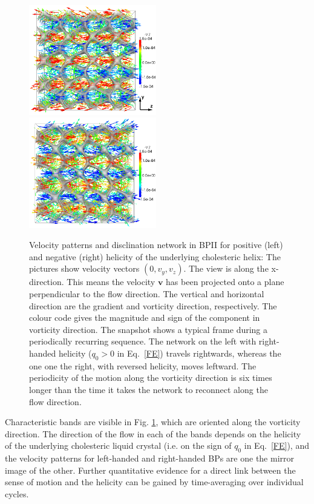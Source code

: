 \documentclass[8.5pt,twoside,twocolumn]{article}
\begin{document}
\begin{figure}[htpb]
\includegraphics[width=0.495\textwidth]{v_yz-v_z-160k_run902.png}
\includegraphics[width=0.495\textwidth]{v_yz-v_z-160k_run903.png}
\caption{Velocity patterns and disclination network in BPII for positive (left) and negative (right) helicity of the 
underlying cholesteric helix: The pictures show velocity vectors $(0,v_y,v_z)$.
The view is along the x-direction. This means the velocity ${\mathbf v}$ 
has been projected onto a plane perpendicular to the flow direction. 
The vertical and horizontal direction are the gradient and vorticity direction, respectively.
The colour code gives the magnitude and sign of the component in vorticity direction.
The snapshot shows a typical frame during a periodically recurring sequence.
The network on the left with right-handed helicity ($q_0>0$ in Eq.~\ref{FE}) travels rightwards, whereas the one one the right,
with reversed helicity, moves leftward. 
The periodicity of the motion along the vorticity direction is six times longer than the time 
it takes the network to reconnect along the flow direction.}
\label{bp2-velo}
\end{figure}

Characteristic bands are visible in Fig. \ref{bp2-velo}, which are 
oriented along the vorticity direction. The direction of the flow
in each of the bands depends on the helicity of the underlying cholesteric
liquid crystal (i.e. on the sign of $q_0$ in Eq.~\ref{FE}), and the velocity
patterns for left-handed and right-handed BPs are one the mirror image of
the other. 
Further quantitative evidence for a direct link between the sense of motion 
and the helicity can be gained by time-averaging over individual cycles.
\end{document}
